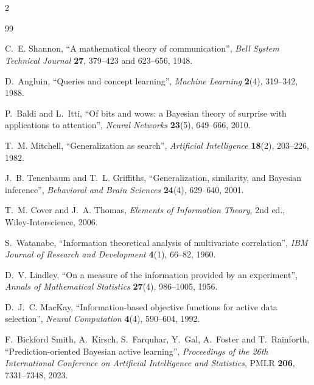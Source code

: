 \documentclass[11pt]{article}
\let\stdsection\section
\renewcommand{\section}{\clearpage\stdsection}
\begin{document}
\clearpage
{}
\stdsection*{\refname}
\begingroup
\renewcommand{\section}[2]{}
\small
\begin{multicols}{2}
\begin{thebibliography}{99}

C.~E. Shannon,
``A mathematical theory of communication'',
\emph{Bell System Technical Journal} \textbf{27}, 379--423 and
623--656, 1948.

D.~Angluin,
``Queries and concept learning'',
\emph{Machine Learning} \textbf{2}(4), 319--342, 1988.

P.~Baldi and L.~Itti,
``Of bits and wows: a Bayesian theory of surprise with applications to
attention'',
\emph{Neural Networks} \textbf{23}(5), 649--666, 2010.

T.~M. Mitchell,
``Generalization as search'',
\emph{Artificial Intelligence} \textbf{18}(2), 203--226, 1982.

J.~B. Tenenbaum and T.~L. Griffiths,
``Generalization, similarity, and Bayesian inference'',
\emph{Behavioral and Brain Sciences} \textbf{24}(4), 629--640, 2001.

T.~M. Cover and J.~A. Thomas,
\emph{Elements of Information Theory}, 2nd ed.,
Wiley-Interscience, 2006.

S.~Watanabe,
``Information theoretical analysis of multivariate correlation'',
\emph{IBM Journal of Research and Development} \textbf{4}(1), 66--82,
1960.

D.~V. Lindley,
``On a measure of the information provided by an experiment'',
\emph{Annals of Mathematical Statistics} \textbf{27}(4), 986--1005, 1956.

D.~J.~C. MacKay,
``Information-based objective functions for active data selection'',
\emph{Neural Computation} \textbf{4}(4), 590--604, 1992.

F.~Bickford Smith, A.~Kirsch, S.~Farquhar, Y.~Gal, A.~Foster and
T.~Rainforth,
``Prediction-oriented Bayesian active learning'',
\emph{Proceedings of the 26th International Conference on Artificial
Intelligence and Statistics}, PMLR \textbf{206}, 7331--7348, 2023.


\end{thebibliography}
\end{multicols}
\end{document}
